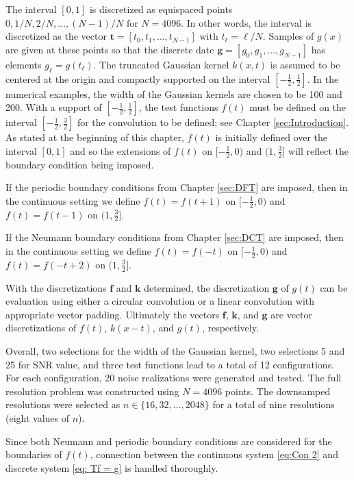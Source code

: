 \documentclass[12pt,notitlepage]{report}
\newcommand{\gVec}{\mathbf{g}}	%
\newcommand{\kVec}{\mathbf{k}}	%
\newcommand{\fVec}{\mathbf{f}}	%
\newcommand{\tVec}{\mathbf{t}}	%
\begin{document}
The interval $[0,1]$ is discretized as equispaced points $0, 1/N, 2/N, \ldots, (N-1)/N$ for $N = 4096$. In other words, the interval is discretized as the vector $\tVec = [t_0,t_1,\ldots,t_{N-1}]$ with $t_\ell = \ell/N$. Samples of $g(x)$ are given at these points so that the discrete date $\gVec = [g_0,g_1,\ldots,g_{N-1}]$ has elements $g_\ell = g(t_\ell)$. The truncated Gaussian kernel $k(x,t)$ is assumed to be centered at the origin and compactly supported on the interval $[-\frac{1}{2},\frac{1}{2}]$. In the numerical examples, the width of the Gaussian kernels are chosen to be 100 and 200. With a support of $[-\frac{1}{2},\frac{1}{2}]$, the test functions $f(t)$ must be defined on the interval $[-\frac{1}{2},\frac{3}{2}]$ for the convolution to be defined; see Chapter \ref{sec:Introduction}. As stated at the beginning of this chapter, $f(t)$ is initially defined over the interval $[0,1]$ and so the extensions of $f(t)$ on $[-\frac{1}{2},0)$ and $(1,\frac{3}{2}]$ will reflect the boundary condition being imposed. \par
If the periodic boundary conditions from Chapter \ref{sec:DFT} are imposed, then in the continuous setting we define $f(t) = f(t+1)$ on $[-\frac{1}{2},0)$ and $f(t) = f(t-1)$ on $(1,\frac{3}{2}]$. \par 
If the Neumann boundary conditions from Chapter \ref{sec:DCT} are imposed, then in the continuous setting we define $f(t) = f(-t)$ on $[-\frac{1}{2},0)$ and $f(t) = f(-t+2)$ on $(1,\frac{3}{2}]$.


With the discretizations $\fVec$ and $\kVec$ determined, the discretization $\gVec$ of $g(t)$ can be evaluation using either a circular convolution or a linear convolution with appropriate vector padding. Ultimately the vectors $\fVec$, $\kVec$, and $\gVec$ are vector discretizations of $f(t)$, $k(x-t)$, and $g(t)$, respectively. \par
Overall, two selections for the width of the Gaussian kernel, two selections 5 and 25 for SNR value, and three test functions lead to a total of 12 configurations. For each configuration, 20 noise realizations were generated and tested. The full resolution problem was constructed using $N = 4096$ points. The downsamped resolutions were selected as $n \in \{16,32,\ldots,2048\}$ for a total of nine resolutions (eight values of $n$). \par 
Since both Neumann and periodic boundary conditions are considered for the boundaries of $f(t)$, connection between the continuous system \eqref{eq:Con 2} and discrete system \eqref{eq: Tf = g} is handled thoroughly. 
\end{document}
